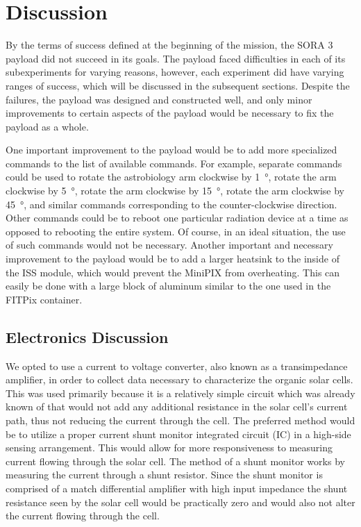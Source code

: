 \section{Discussion}
\label{sec:Discussion}

By the terms of success defined at the beginning of the mission, the SORA 3 payload did not succeed in its goals.
The payload faced difficulties in each of its subexperiments for varying reasons, however, each experiment did have varying ranges of success, which will be discussed in the subsequent sections.
Despite the failures, the payload was designed and constructed well, and only minor improvements to certain aspects of the payload would be necessary to fix the payload as a whole.

One important improvement to the payload would be to add more specialized commands to the list of available commands.
For example, separate commands could be used to rotate the astrobiology arm clockwise by \SI{1}{\degree}, rotate the arm clockwise by \SI{5}{\degree}, rotate the arm clockwise by \SI{15}{\degree}, rotate the arm clockwise by \SI{45}{\degree}, and similar commands corresponding to the counter-clockwise direction.
Other commands could be to reboot one particular radiation device at a time as opposed to rebooting the entire system.
Of course, in an ideal situation, the use of such commands would not be necessary.
Another important and necessary improvement to the payload would be to add a larger heatsink to the inside of the ISS module, which would prevent the MiniPIX from overheating.
This can easily be done with a large block of aluminum similar to the one used in the FITPix container.

\subsection{Electronics Discussion}
\label{subsec:Electronics-Discussion}
We opted to use a current to voltage converter, also known as a transimpedance amplifier, in order to collect data necessary to characterize the organic solar cells.
This was used primarily because it is a relatively simple circuit which was already known of that would not add any additional resistance in the solar cell's current path, thus not reducing the current through the cell.
The preferred method would be to utilize a proper current shunt monitor integrated circuit (IC) in a high-side sensing arrangement.
This would allow for more responsiveness to measuring current flowing through the solar cell.
The method of a shunt monitor works by measuring the current through a shunt resistor.
Since the shunt monitor is comprised of a match differential amplifier with high input impedance the shunt resistance seen by the solar cell would be practically zero and would also not alter the current flowing through the cell.

